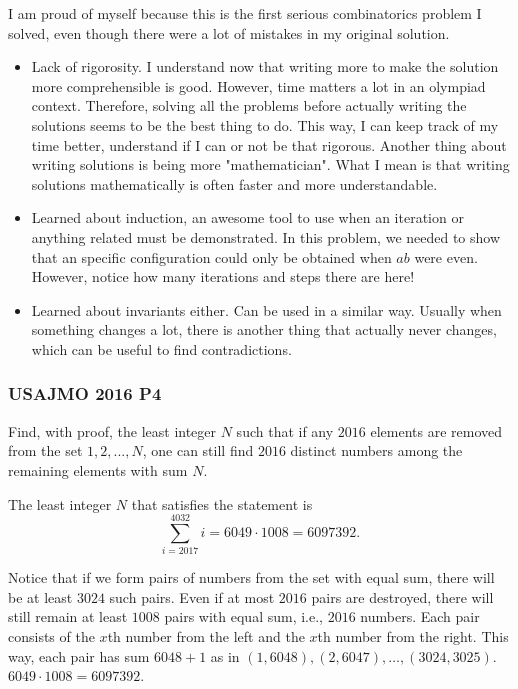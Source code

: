 \begin{insight}
	I am proud of myself because this is the first serious combinatorics problem I
	solved, even though there were a lot of mistakes in my original solution.

	\begin{itemize}
		\item Lack of rigorosity. I understand now that writing more to make the
		      solution more comprehensible is good. However, time matters a lot in
		      an olympiad context. Therefore, solving all the problems before actually
		      writing the solutions seems to be the best thing to do. This way, I can
		      keep track of my time better, understand if I can or not be that rigorous.
		      Another thing about writing solutions is being more "mathematician".
		      What I mean is that writing solutions mathematically is often faster
		      and more understandable.
		\item Learned about induction, an awesome tool to use when an iteration or
		      anything related must be demonstrated. In this problem, we needed to show
		      that an specific configuration could only be obtained when $ab$ were even.
		      However, notice how many iterations and steps there are here!
		\item Learned about invariants either. Can be used in a similar way. Usually
		      when something changes a lot, there is another thing that actually never
		      changes, which can be useful to find contradictions.
	\end{itemize}
\end{insight}

\clearpage

\subsubsection{USAJMO 2016 P4}
\begin{problem}
Find, with proof, the least integer $N$ such that if any $2016$ elements are
removed from the set ${1, 2,...,N}$, one can still find $2016$ distinct numbers
among the remaining elements with sum $N$.
\end{problem}

The least integer $N$ that satisfies the statement is
\[
	\sum^{4032}_{i=2017} i = 6049 \cdot 1008 = 6097392.
\]

Notice that if we form pairs of numbers from the set with equal sum, there will be
at least $3024$ such pairs. Even if at most $2016$ pairs are destroyed, there will
still remain at least $1008$ pairs with equal sum, i.e., $2016$ numbers. Each pair
consists of the $x$th number from the left and the $x$th number from the right.
This way, each pair has sum $6048+1$ as in $(1,6048), (2,6047), \dots, (3024,3025)$.
$6049 \cdot 1008 = 6097392$.

